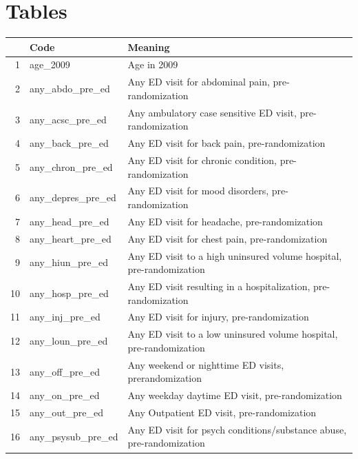 \appendix

\newpage
\printbibliography

\newpage
\section{Tables}

\begin{table}[ht]
  {
    \tiny
    \centering
  \begin{tabular}{rll}
    \hline
   & Code & Meaning \\ 
    \hline
  1 & age\_2009 & Age in 2009 \\ 
    2 & any\_abdo\_pre\_ed & Any ED visit for abdominal pain, pre-randomization \\ 
    3 & any\_acsc\_pre\_ed & Any ambulatory case sensitive ED visit, pre-randomization \\ 
    4 & any\_back\_pre\_ed & Any ED visit for back pain, pre-randomization \\ 
    5 & any\_chron\_pre\_ed & Any ED visit for chronic condition, pre-randomization \\ 
    6 & any\_depres\_pre\_ed & Any ED visit for mood disorders, pre-randomization \\ 
    7 & any\_head\_pre\_ed & Any ED visit for headache, pre-randomization \\ 
    8 & any\_heart\_pre\_ed & Any ED visit for chest pain, pre-randomization \\ 
    9 & any\_hiun\_pre\_ed & Any ED visit to a high uninsured volume hospital, pre-randomization \\ 
    10 & any\_hosp\_pre\_ed & Any ED visit resulting in a hospitalization, pre-randomization \\ 
    11 & any\_inj\_pre\_ed & Any ED visit for injury, pre-randomization \\ 
    12 & any\_loun\_pre\_ed & Any ED visit to a low uninsured volume hospital, pre-randomization \\ 
    13 & any\_off\_pre\_ed & Any weekend or nighttime ED visits, prerandomization \\ 
    14 & any\_on\_pre\_ed & Any weekday daytime ED visit, pre-randomization \\ 
    15 & any\_out\_pre\_ed & Any Outpatient ED visit, pre-randomization \\ 
    16 & any\_psysub\_pre\_ed & Any ED visit for psych conditions/substance abuse, pre-randomization \\ 

\end{tabular}}
\end{table}
